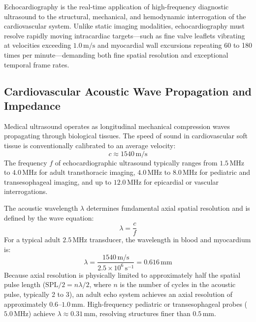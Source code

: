 \documentclass[11pt,a4paper]{article}
\begin{document}
Echocardiography is the real-time application of high-frequency diagnostic ultrasound to the structural, mechanical, and hemodynamic interrogation of the cardiovascular system. Unlike static imaging modalities, echocardiography must resolve rapidly moving intracardiac targets—such as fine valve leaflets vibrating at velocities exceeding $1.0\,\text{m/s}$ and myocardial wall excursions repeating 60 to 180 times per minute—demanding both fine spatial resolution and exceptional temporal frame rates.

\subsection{Cardiovascular Acoustic Wave Propagation and Impedance}

Medical ultrasound operates as longitudinal mechanical compression waves propagating through biological tissues. The speed of sound in cardiovascular soft tissue is conventionally calibrated to an average velocity:
\begin{equation}
    c \approx 1540\,\text{m/s}
\end{equation}
The frequency $f$ of echocardiographic ultrasound typically ranges from $1.5\,\text{MHz}$ to $4.0\,\text{MHz}$ for adult transthoracic imaging, $4.0\,\text{MHz}$ to $8.0\,\text{MHz}$ for pediatric and transesophageal imaging, and up to $12.0\,\text{MHz}$ for epicardial or vascular interrogations.

The acoustic wavelength $\lambda$ determines fundamental axial spatial resolution and is defined by the wave equation:
\begin{equation}
    \lambda = \frac{c}{f}
\end{equation}
For a typical adult $2.5\,\text{MHz}$ transducer, the wavelength in blood and myocardium is:
\begin{equation}
    \lambda = \frac{1540\,\text{m/s}}{2.5 \times 10^6\,\text{s}^{-1}} = 0.616\,\text{mm}
\end{equation}
Because axial resolution is physically limited to approximately half the spatial pulse length ($\text{SPL} / 2 = n \lambda / 2$, where $n$ is the number of cycles in the acoustic pulse, typically 2 to 3), an adult echo system achieves an axial resolution of approximately $0.6\text{--}1.0\,\text{mm}$. High-frequency pediatric or transesophageal probes ($5.0\,\text{MHz}$) achieve $\lambda \approx 0.31\,\text{mm}$, resolving structures finer than $0.5\,\text{mm}$.
\end{document}
